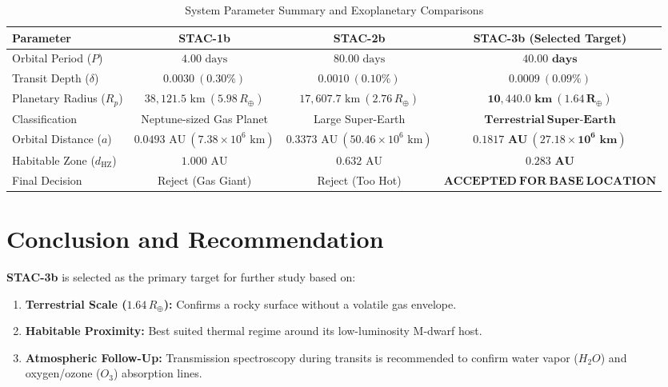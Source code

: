 \documentclass[journal,10pt,twocolumn]{IEEEtran}
\begin{document}
\begin{table}[t]
\caption{System Parameter Summary and Exoplanetary Comparisons}
\label{tab:summary}
\centering
\begin{tabular}{l c c c}
\toprule
\textbf{Parameter} & \textbf{STAC-1b} & \textbf{STAC-2b} & \textbf{STAC-3b (Selected Target)} \\
\midrule
Orbital Period ($P$) & $4.00\text{ days}$ & $80.00\text{ days}$ & $\mathbf{40.00\text{ days}}$ \\
Transit Depth ($\delta$) & $0.0030\ (0.30\%)$ & $0.0010\ (0.10\%)$ & $\mathbf{0.0009\ (0.09\%)}$ \\
Planetary Radius ($R_p$) & $38,121.5\text{ km}\ (5.98\,R_\oplus)$ & $17,607.7\text{ km}\ (2.76\,R_\oplus)$ & $\mathbf{10,440.0\text{ km}\ (1.64\,R_\oplus)}$ \\
Classification & Neptune-sized Gas Planet & Large Super-Earth & $\mathbf{Terrestrial\ Super\text{-}Earth}$ \\
Orbital Distance ($a$) & $0.0493\text{ AU}\ (7.38 \times 10^6\text{ km})$ & $0.3373\text{ AU}\ (50.46 \times 10^6\text{ km})$ & $\mathbf{0.1817\text{ AU}\ (27.18 \times 10^6\text{ km})}$ \\
Habitable Zone ($d_{\text{HZ}}$) & $1.000\text{ AU}$ & $0.632\text{ AU}$ & $\mathbf{0.283\text{ AU}}$ \\
Final Decision & Reject (Gas Giant) & Reject (Too Hot) & $\mathbf{ACCEPTED\ FOR\ BASE\ LOCATION}$ \\
\bottomrule
\end{tabular}
\end{table}

\section{Conclusion and Recommendation}
\textbf{STAC-3b} is selected as the primary target for further study based on:
\begin{enumerate}
    \item \textbf{Terrestrial Scale ($1.64\,R_\oplus$):} Confirms a rocky surface without a volatile gas envelope.
    \item \textbf{Habitable Proximity:} Best suited thermal regime around its low-luminosity M-dwarf host.
    \item \textbf{Atmospheric Follow-Up:} Transmission spectroscopy during transits is recommended to confirm water vapor ($H_2O$) and oxygen/ozone ($O_3$) absorption lines.
\end{enumerate}
\end{document}
